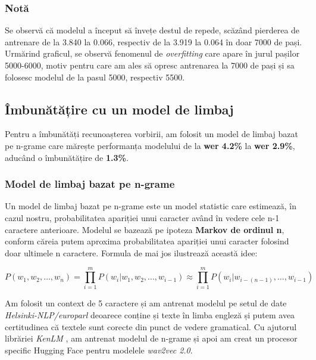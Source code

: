 \subsubsection{Notă}
Se observă că modelul a început să învețe destul de repede, scăzând pierderea de antrenare
de la 3.840 la 0.066, respectiv de la 3.919 la 0.064 în doar 7000 de pași. Urmărind graficul,
se observă fenomenul de \textit{overfitting} care apare în jurul pașilor 5000-6000, motiv
pentru care am ales să opresc antrenarea la 7000 de pași și sa folosesc modelul de
la pasul 5000, respectiv 5500.




\subsection{Îmbunătățire cu un model de limbaj}
Pentru a îmbunătăți recunoașterea vorbirii, am folosit un model de limbaj bazat pe n-grame care 
mărește performanța modelului de la \textbf{wer 4.2\%}  la \textbf{wer 2.9\%}, aducând
o îmbunătățire de \textbf{1.3\%}.

\subsubsection{Model de limbaj bazat pe n-grame}
Un model de limbaj bazat pe n-grame este un model statistic care estimează, în cazul nostru, probabilitatea
apariției unui caracter având în vedere cele n-1 caractere anterioare. Modelul se bazează pe
ipoteza \textbf{Markov de ordinul n}, conform căreia putem aproxima probabilitatea apariției unui caracter
folosind doar ultimele n caractere. Formula de mai jos ilustrează această idee:

\begin{equation}
    P(w_1, w_2, \ldots, w_n) = \prod_{i=1}^{m} P(w_i | w_{1}, w_{2}, \ldots, w_{i-1}) \approx \prod_{i=1}^{m} P(w_i | w_{i-(n-1)}, \ldots, w_{i-1})
\end{equation}
\vspace{1em}

\par
Am folosit un context de 5 caractere și am antrenat modelul pe
setul de date \textit{Helsinki-NLP/europarl} \cite{tiedemann-2012-parallel} deoarece conține și
texte în limba engleză și putem avea certitudinea că textele sunt corecte din punct de vedere
gramatical. Cu ajutorul librăriei \textit{KenLM} \cite{heafield-2011-kenlm}, am antrenat modelul
de n-grame și apoi am creat un procesor specific Hugging Face pentru modelele \textit{wav2vec 2.0}.

